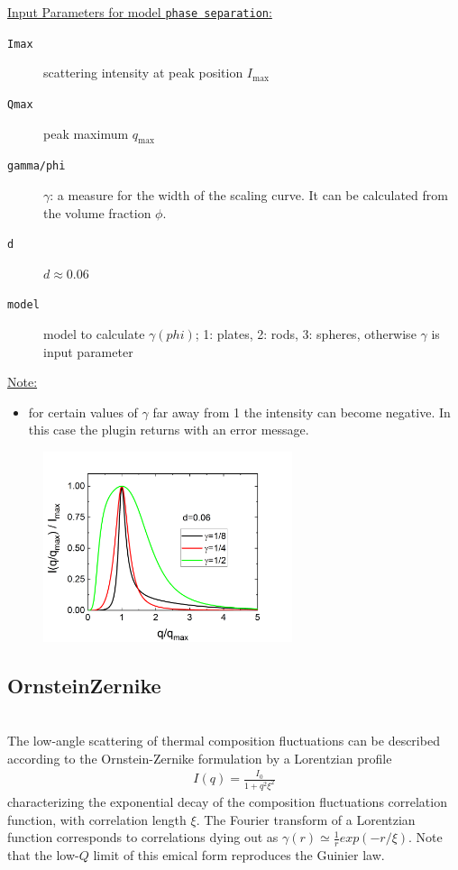 \vspace{5mm}

\underline{Input Parameters for model \texttt{phase separation}:}\\
\begin{description}
\item[\texttt{Imax}] scattering intensity at peak position $I_\text{max}$
\item[\texttt{Qmax}] peak maximum $q_\text{max}$
\item[\texttt{gamma/phi}] $\gamma$: a measure for the width of the scaling curve. It can be calculated from the volume fraction $\phi$.
\item[\texttt{d}] $d \approx 0.06$
\item[\texttt{model}] model to calculate $\gamma(phi)$; 1: plates, 2: rods, 3: spheres, otherwise $\gamma$ is input parameter
\end{description}

\underline{Note:}
\begin{itemize}
\item for certain values of $\gamma$ far away from 1 the intensity can become negative. In this case the plugin returns with an error message.
\end{itemize}



\begin{figure}[htb]
\begin{center}
\includegraphics[width=0.65\textwidth]{../images/form_factor/nonparticular/phase_separation.png}
\end{center}
\caption{} \label{fig:phaseseparationIQ}
\end{figure}

\clearpage
\subsection{OrnsteinZernike}
\label{sect:Zernike}
 ~\\
The low-angle scattering of thermal composition fluctuations can be
described according to the Ornstein-Zernike formulation by a
Lorentzian profile
\begin{align}
I(q) = \frac{I_0}{1+q^2\xi^2}
\end{align}
characterizing the exponential decay of the composition fluctuations
correlation function, with correlation length $\xi$. The Fourier
transform of a Lorentzian function corresponds to correlations dying
out as $\gamma(r) \simeq \frac{1}{r}exp(-r/\xi)$. Note that the
low-$Q$ limit of this emical form reproduces the Guinier law.

